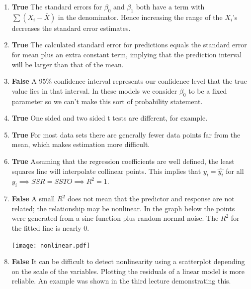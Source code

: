 \documentclass[12pt]{article}
\begin{document}
\begin{enumerate}[label=\alph*]
\item \textbf{True} The standard errors for $\beta_0$ and $\beta_1$ both
have a term with $\sum (X_i - \bar{X})$ in the denominator. Hence increasing the
range of the $X_i$'s decreases the standard error estimates.

\item \textbf{True} The calculated standard error for predictions equals the 
standard error for mean plus an extra constant term,
implying that the prediction interval will be larger than that of the mean.

\item \textbf{False} A 95\% confidence interval represents our confidence
level that the true value lies in that interval. In these models we consider
$\beta_0$ to be a fixed parameter so we can't make this sort of probability
statement.

\item \textbf{True} One sided and two sided t tests are different, for
example.

\item \textbf{True} For most data sets there are generally fewer data points far from the mean,
which makes estimation more difficult. 

\item \textbf{True} Assuming that the regression coefficients are well 
defined, the least squares line will interpolate collinear points. This
implies that $y_i = \hat{y_i}$ for all $y_i \implies SSR = SSTO \implies R^2 = 1$.

\item \textbf{False} A small $R^2$ does not mean that the predictor and
response are not related; the relationship may be nonlinear. In the graph
below the points were generated from a sine function plus random normal
noise. The $R^2$ for the fitted line is nearly 0.

\centerline{\texttt{[image: nonlinear.pdf]}}

\item \textbf{False} It can be difficult to detect nonlinearity using a
scatterplot depending on the  scale of the variables.
Plotting the residuals of a linear model is more reliable.
An example was shown in the third lecture demonstrating this.

\end{enumerate}
\end{document}
